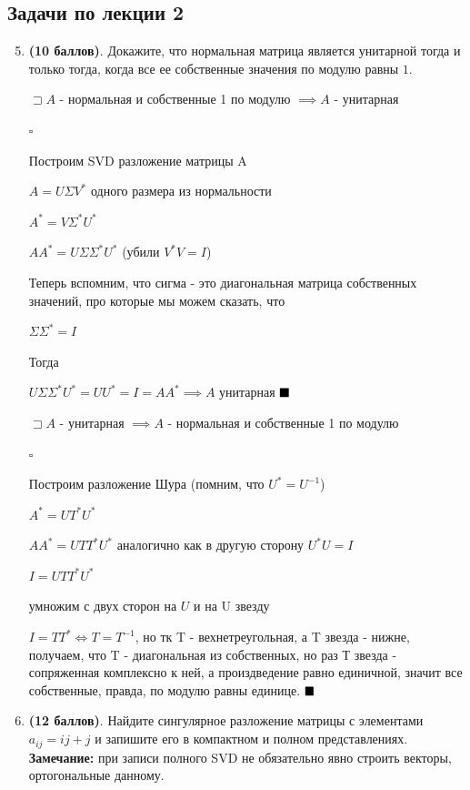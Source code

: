 \documentclass[a4paper, 11pt]{article}
\newcommand{\prob}[1]{\item \textbf{(#1 баллов)}.}
\begin{document}
	\subsection*{Задачи по лекции 2}
	\begin{enumerate}
		\setcounter{enumi}{4}
		\prob{10} Докажите, что нормальная матрица является унитарной тогда и только тогда, когда все ее собственные значения по модулю равны $1$.
		
			$\sqsupset A$ - нормальная и собственные 1 по модулю $\implies A$ - унитарная
				
				$\square$
			
				Построим SVD разложение матрицы A
				
					$A = U \Sigma V^* $ одного размера из нормальности
					
					$A^* = V \Sigma^* U^*$
					
					$AA^* = U \Sigma \Sigma^* U^*$ (убили $V^*V = I$)
					
					Теперь вспомним, что сигма - это диагональная матрица собственных значений, про которые мы можем сказать, что 
					
					$\Sigma \Sigma^* = I$
					
					Тогда
					
					$U \Sigma \Sigma^* U^* = UU^* = I = AA^* \implies A$ унитарная $\hfill \blacksquare$
					
			$\sqsupset A$ - унитарная $\implies A$ - нормальная и собственные 1 по модулю
			
			$\square$
			
				Построим разложение Шура (помним, что $U^* = U^{-1}$)
				
					$A^* = U T^* U^*$
					
					$AA^* = UTT^*U^*$ аналогично как в другую сторону $U^*U = I$
					
					$I = UTT^*U^*$
					
					умножим с двух сторон на $U$ и на U звезду
					
					$I = TT^* \Longleftrightarrow T = T^{-1}$, но тк T - вехнетреугольная, а T звезда - нижне, получаем, что T - диагональная из собственных, но раз Т звезда - сопряженная комплексно к ней, а произдведение равно единичной, значит все собственные, правда, по модулю равны единице. $\hfill \blacksquare$		
		
		\prob{12} Найдите сингулярное разложение матрицы с элементами $a_{ij} = ij + j$ и запишите его в компактном и полном представлениях. \textbf{Замечание:} при записи полного SVD не обязательно явно строить векторы, ортогональные данному.
		

\end{enumerate}
\end{document}
